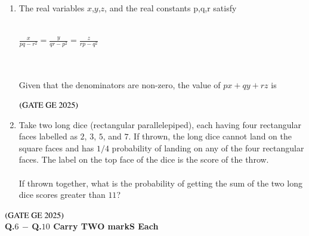 \documentclass[journal,12pt,onecolumn]{IEEEtran}
\theoremstyle{remark}
\begin{document}
\begin{enumerate}
\item The real variables $x$,$y$,$z$, and the real constants p,q,r satisfy \\
\\
\centerline{\large $\frac{x}{pq-r^{2}}=\frac{y}{qr-p^{2}}=\frac{z}{rp-q^{2}}$}
\\ \\Given that the denominators are non-zero, the value of $px+qy+rz$ is
\begin{enumerate}
\end{enumerate}
\hfill $\left(\text{GATE GE 2025}\right)$
\bigskip
\item Take two long dice (rectangular parallelepiped), each having four rectangular faces
labelled as $2$, $3$, 
$5$, and $7$. If thrown, the long dice cannot land on the square faces and has $1/4$ probability of landing on any of the four rectangular faces.
The label on the top face of the dice is the score of the throw.\\
\\If thrown together, what is the probability of getting the sum of the two long dice scores greater than $11$?
\begin{enumerate}
\end{enumerate}
\end{enumerate}
\hfill $\left(\text{GATE GE 2025}\right)$
\bigskip
\\
\textbf{Q.$6$ $-$ Q.$10$ Carry TWO markS Each}\\
\end{document}
